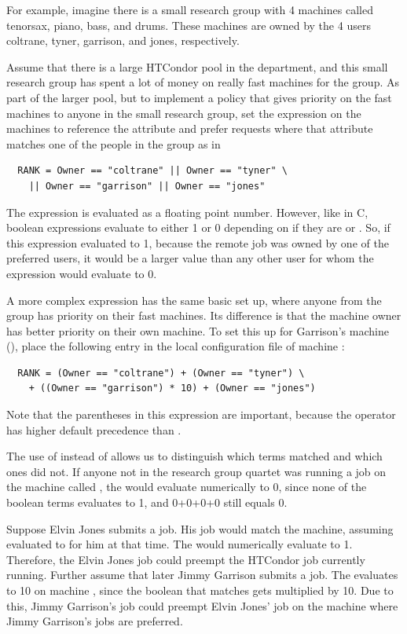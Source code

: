For example, imagine there is a small research group with 4 machines
called tenorsax, piano, bass, and drums.
These machines are owned by the 4 users
coltrane, tyner, garrison, and jones,
respectively.  

Assume that there is a large HTCondor pool in the department,
and this small research group has spent a lot of money on really fast machines 
for the group.
As part of the larger pool, 
but to implement a policy that gives priority on the fast machines to
anyone in the small research group,
set the 
expression on the machines to reference the  attribute and
prefer requests where that attribute matches one of the people in the
group as in
\begin{verbatim}
  RANK = Owner == "coltrane" || Owner == "tyner" \
    || Owner == "garrison" || Owner == "jones"
\end{verbatim}

The  expression is evaluated as a floating point number.
However, like in C, boolean expressions evaluate to either 1 or 0
depending on if they are \Expr{True} or \Expr{False}.
So, if this expression
evaluated to 1, 
because the remote job was owned by one of the preferred users,
it would be a larger value than any other
user for whom the expression would evaluate to 0.

A more complex  expression
has the same basic set up,
where anyone from the group has priority on their fast machines.
Its difference is that
the machine owner has better priority on their own machine.
To set this up for Garrison's machine (),
place the following entry in the local configuration file 
of machine \Expr{bass}:
\begin{verbatim}
  RANK = (Owner == "coltrane") + (Owner == "tyner") \
    + ((Owner == "garrison") * 10) + (Owner == "jones")
\end{verbatim}
Note that the parentheses in this expression are important, because 
the \Expr{+} operator has higher default precedence than \Expr{==}.

The use of \Expr{+} instead of \Expr{||} allows us to 
distinguish which terms matched and which ones did not.
If anyone not in the research group quartet was running a job on
the machine called \Expr{bass},
the \MacroNI{RANK} would evaluate numerically to 0, since none
of the boolean terms evaluates to 1, and 0+0+0+0 still equals 0.

Suppose Elvin Jones submits a job.
His job would match the  machine,
assuming \MacroNI{START} evaluated to  for him at that time.
The  would numerically evaluate to 1.
Therefore, the Elvin Jones job could preempt the HTCondor job currently running.
Further assume that later Jimmy Garrison submits a job.
The \MacroNI{RANK} evaluates to 10 on machine , 
since the boolean that matches gets multiplied by 10.
Due to this, Jimmy Garrison's job could preempt Elvin Jones' job
on the \Expr{bass} machine where Jimmy Garrison's jobs are preferred.

